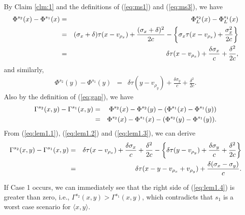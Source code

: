\documentclass[a4paper]{llncs}
\begin{document}
By Claim \ref{clm:1} and the definitions of (\ref{eq:ms1}) and (\ref{eq:ms3}), we have 
\begin{eqnarray}
\Phi^{s_2}(x) - \Phi^{s_1}(x)	&=& \Phi^{s_2}_L(x) - \Phi^{s_1}_L(x) \notag \\
						&=& (\sigma_x+\delta)\tau(x - v_{\rho_x}) + \frac{(\sigma_x+\delta)^2}{2c} - \left\{\sigma_x\tau(x - v_{\rho_x}) + \frac{\sigma_x^2}{2c}\right\} \notag \\
						&=& \delta\tau(x - v_{\rho_x}) + \frac{\delta\sigma_x}{c} + \frac{\delta^2}{2c},
\label{eq:lem1.1}
\end{eqnarray}
and similarly, 
\begin{eqnarray}
\Phi^{s_2}(y) - \Phi^{s_1}(y)	&=& \delta\tau(y - v_{\rho_y}) + \frac{\delta\sigma_y}{c} + \frac{\delta^2}{2c}.
\label{eq:lem1.2}
\end{eqnarray}
Also by the definition of (\ref{eq:gap}), we have
\begin{eqnarray}
\Gamma^{s_2}(x, y) - \Gamma^{s_1}(x, y)	&=& \Phi^{s_2}(x) - \Phi^{s_2}(y) - (\Phi^{s_1}(x) - \Phi^{s_1}(y)) \notag \\
								&=& \Phi^{s_2}(x) - \Phi^{s_1}(x) - (\Phi^{s_2}(y) - \Phi^{s_1}(y)).
\label{eq:lem1.3}
\end{eqnarray}
From (\ref{eq:lem1.1}), (\ref{eq:lem1.2}) and (\ref{eq:lem1.3}), we can derive 
\begin{eqnarray}
\Gamma^{s_2}(x, y) - \Gamma^{s_1}(x, y)	&=& \delta\tau(x - v_{\rho_x}) + \frac{\delta\sigma_x}{c} + \frac{\delta^2}{2c} - \left\{\delta\tau(y - v_{\rho_y}) + \frac{\delta\sigma_y}{c} + \frac{\delta^2}{2c}\right\} \notag \\
								&=& \delta\tau(x - y - v_{\rho_x} + v_{\rho_y}) + \frac{\delta(\sigma_x-\sigma_y)}{c}.
\label{eq:lem1.4}
\end{eqnarray}

If Case 1 occurs, 
we can immediately see that the right side of (\ref{eq:lem1.4}) is greater than zero, i.e., $\Gamma^{s_2}(x, y) > \Gamma^{s_1}(x, y)$,
which contradicts that $s_1$ is a worst case scenario for $\langle x, y \rangle$.
\end{document}
